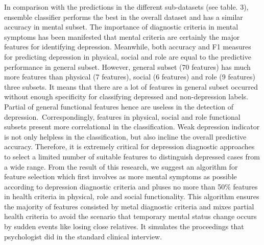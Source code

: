 \documentclass[10pt,journal,compsoc]{IEEEtran}
\begin{document}
In comparison with the predictions in the different sub-datasets (see table. 3), ensemble classifier performs the best in the overall dataset and has a similar accuracy in mental subset. The importance of diagnostic criteria in mental symptoms has been manifested that mental criteria are certainly the major features for identifying depression. Meanwhile, both accuracy and F1 measures for predicting depression in physical, social and role are equal to the predictive performance in general subset. However, general subset (70 features) has much more features than physical (7 features), social (6 features) and role (9 features) three subsets. It means that there are a lot of features in general subset occurred without enough specificity for classifying depressed and non-depression labels. Partial of general functional features hence are useless in the detection of depression. Correspondingly, features in physical, social and role functional subsets present more correlational in the classification. Weak depression indicator is not only helpless in the classification, but also incline the overall predictive accuracy. Therefore, it is extremely critical for depression diagnostic approaches to select a limited number of suitable features to distinguish depressed cases from a wide range. From the result of this research, we suggest an algorithm for feature selection which first involves as more mental symptoms as possible according to depression diagnostic criteria and pluses no more than 50\% features in health criteria in physical, role and social functionality. This algorithm ensures the majority of features consisted by metal diagnostic criteria and mixes partial health criteria to avoid the scenario that temporary mental status change occurs by sudden events like losing close relatives. It simulates the proceedings that psychologist did in the standard clinical interview. 

%
%
\end{document}
